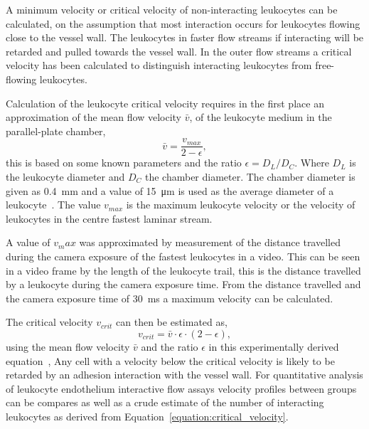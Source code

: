 A minimum velocity or critical velocity of non-interacting leukocytes can be calculated, on the assumption that most interaction occurs for leukocytes flowing close to the vessel wall. The leukocytes in faster flow streams if interacting will be retarded and pulled towards the vessel wall. In the outer flow streams a critical velocity has been calculated to distinguish interacting leukocytes from free-flowing leukocytes.

Calculation of the leukocyte critical velocity requires in the first place an approximation of the mean flow velocity $\bar{v}$, of the leukocyte medium in the parallel-plate chamber,
\begin{equation}
	\bar{v}=\frac{v_{max}}{2-\epsilon},
\end{equation}
this is based on some known parameters and the ratio $\epsilon = D_L/D_C$. Where $D_L$ is the leukocyte diameter and $D_C$ the chamber diameter. The chamber diameter is given as \SI{0.4}{\milli\meter} and a value of \SI{15}{\micro\meter} is used as the average diameter of a leukocyte~\cite{Dorgan1998}. The value $v_{max}$ is the maximum leukocyte velocity or the velocity of leukocytes in the centre fastest laminar stream. 

A value of $v_max$ was approximated by measurement of the distance travelled during the camera exposure of the fastest leukocytes in a video. This can be seen in a video frame by the length of the leukocyte trail, this is the distance travelled by a leukocyte during the camera exposure time. From the distance travelled and the camera exposure time of \SI{30}{\milli\second} a maximum velocity can be calculated.

The critical velocity $v_{crit}$ can then be estimated as,
\begin{equation}
	v_{crit}=\bar{v}\cdot\epsilon\cdot(2-\epsilon),
\label{equation:critical_velocity}
\end{equation}
using the mean flow velocity $\bar{v}$ and the ratio $\epsilon$ in this experimentally derived equation~\cite{Ley1991},
Any cell with a velocity below the critical velocity is likely to be retarded by an adhesion interaction with the vessel wall. For quantitative analysis of leukocyte endothelium interactive flow assays velocity profiles between groups can be compares as well as a crude estimate of the number of interacting leukocytes as derived from Equation~\ref{equation:critical_velocity}.

